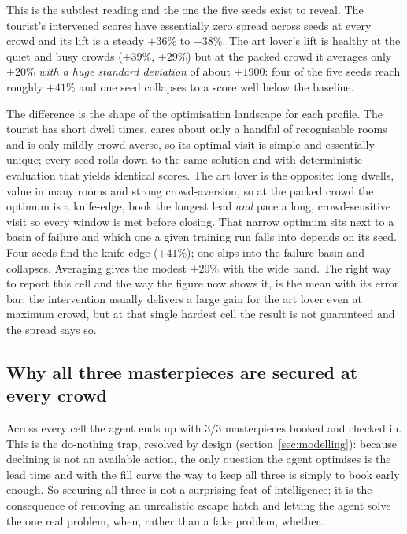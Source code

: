 \documentclass[11pt]{article}
\newcommand{\why}[1]{\textcolor{inkblue}{#1}}
\begin{document}
This is the subtlest reading and the one the five seeds exist to reveal. The tourist's
intervened scores have essentially zero spread across seeds at every crowd and its lift is
a steady $+36\%$ to $+38\%$. The art lover's lift is healthy at the quiet and busy crowds
($+39\%$, $+29\%$) but at the packed crowd it averages only $+20\%$ \emph{with a huge
standard deviation} of about $\pm 1900$: four of the five seeds reach roughly $+41\%$ and
one seed collapses to a score well below the baseline.

\why{The difference is the shape of the optimisation landscape for each profile. The tourist
has short dwell times, cares about only a handful of recognisable rooms and is only mildly
crowd-averse, so its optimal visit is simple and essentially unique; every seed rolls down
to the same solution and with deterministic evaluation that yields identical scores.} The
art lover is the opposite: long dwells, value in many rooms and strong crowd-aversion, so
at the packed crowd the optimum is a knife-edge, book the longest lead \emph{and} pace a
long, crowd-sensitive visit so every window is met before closing. \why{That narrow optimum
sits next to a basin of failure and which one a given training run falls into depends on
its seed. Four seeds find the knife-edge ($+41\%$); one slips into the failure basin and
collapses. Averaging gives the modest $+20\%$ with the wide band.} The right way to report
this cell and the way the figure now shows it, is the mean with its error bar: the
intervention usually delivers a large gain for the art lover even at maximum crowd, but at
that single hardest cell the result is not guaranteed and the spread says so.

\subsection{Why all three masterpieces are secured at every crowd}

Across every cell the agent ends up with $3/3$ masterpieces booked and checked in.
\why{This is the do-nothing trap, resolved by design (section~\ref{sec:modelling}): because declining is
not an available action, the only question the agent optimises is the lead time and with
the fill curve the way to keep all three is simply to book early enough.} So securing all
three is not a surprising feat of intelligence; it is the consequence of removing an
unrealistic escape hatch and letting the agent solve the one real problem, when, rather than
a fake problem, whether.
\end{document}
